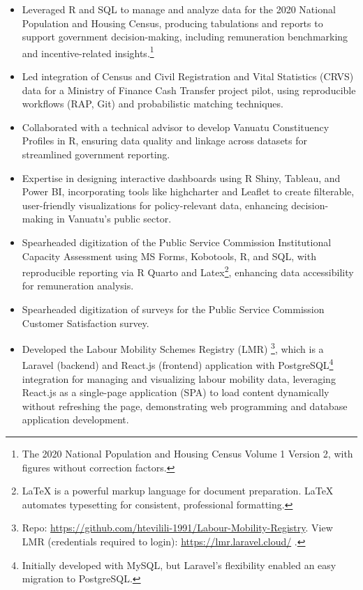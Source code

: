 \documentclass[
  letterpaper,
  DIV=11,
  numbers=noendperiod]{scrartcl}
\providecommand{\tightlist}{%
  \setlength{\itemsep}{0pt}\setlength{\parskip}{0pt}}
\begin{document}
\begin{itemize}
\tightlist
\item
  Leveraged R and SQL to manage and analyze data for the 2020 National
  Population and Housing Census, producing tabulations and reports to
  support government decision-making, including remuneration
  benchmarking and incentive-related insights.\footnote{The 2020
    National Population and Housing Census Volume 1 Version 2, with
    figures without correction factors.}
\item
  Led integration of Census and Civil Registration and Vital Statistics
  (CRVS) data for a Ministry of Finance Cash Transfer project pilot,
  using reproducible workflows (RAP, Git) and probabilistic matching
  techniques.
\item
  Collaborated with a technical advisor to develop Vanuatu Constituency
  Profiles in R, ensuring data quality and linkage across datasets for
  streamlined government reporting.
\item
  Expertise in designing interactive dashboards using R Shiny, Tableau,
  and Power BI, incorporating tools like highcharter and Leaflet to
  create filterable, user-friendly visualizations for policy-relevant
  data, enhancing decision-making in Vanuatu's public sector.
\item
  Spearheaded digitization of the Public Service Commission
  Institutional Capacity Assessment using MS Forms, Kobotools, R, and
  SQL, with reproducible reporting via R Quarto and Latex\footnote{LaTeX
    is a powerful markup language for document preparation. LaTeX
    automates typesetting for consistent, professional formatting.},
  enhancing data accessibility for remuneration analysis.
\item
  Spearheaded digitization of surveys for the Public Service Commission
  Customer Satisfaction survey.
\item
  Developed the Labour Mobility Schemes Registry (LMR) \footnote{Repo:
    \url{https://github.com/htevilili-1991/Labour-Mobility-Registry}.
    View LMR (credentials required to login):
    \url{https://lmr.laravel.cloud/} .}, which is a Laravel (backend)
  and React.js (frontend) application with PostgreSQL\footnote{Initially
    developed with MySQL, but Laravel's flexibility enabled an easy
    migration to PostgreSQL.} integration for managing and visualizing
  labour mobility data, leveraging React.js as a single-page application
  (SPA) to load content dynamically without refreshing the page,
  demonstrating web programming and database application development.

\end{itemize}
\end{document}
